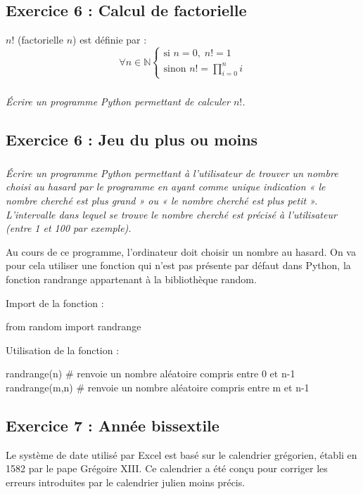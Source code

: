 \documentclass[10pt]{article}
\begin{document}
\subsection*{Exercice 6 : Calcul de factorielle}
$n!$ (factorielle $n$) est définie par :
$$
\forall n\in \mathbb{N} \left\{
\begin{array}{l}
\text{si } n=0, \; n! = 1 \\
\text{sinon } n! = \prod\limits_{i=0}^n i 
\end{array}
\right.
$$

\subparagraph*{}
\textit{Écrire un programme Python permettant de calculer $n!$.}


\subsection*{Exercice 6 : Jeu du plus ou moins}
\setcounter{subparagraph}{0}

\subparagraph*{}
\textit{Écrire un programme Python permettant à l’utilisateur de trouver un nombre choisi au hasard par le programme en ayant comme unique indication « le nombre cherché est plus grand » ou « le nombre cherché est plus petit ». L’intervalle dans lequel se trouve le nombre cherché est précisé à l’utilisateur (entre 1 et 100 par exemple).}

\begin{py}
Au cours de ce programme, l’ordinateur doit choisir un nombre au hasard. On va pour cela utiliser une fonction qui n’est pas présente par défaut dans Python, la fonction randrange appartenant à la bibliothèque random.

Import de la fonction :
\begin{python}
from random import randrange
\end{python}
Utilisation de la fonction :
\begin{python}
randrange(n) # renvoie un nombre aléatoire compris entre 0 et n-1
randrange(m,n) # renvoie un nombre aléatoire compris entre m et n-1
\end{python}
\end{py}



\subsection*{Exercice 7 : Année bissextile}
\setcounter{subparagraph}{0}

Le système de date utilisé par Excel est basé sur le calendrier grégorien, établi en 1582 par le pape Grégoire XIII. Ce calendrier a été conçu pour corriger les erreurs introduites par le calendrier julien moins précis.
\end{document}

